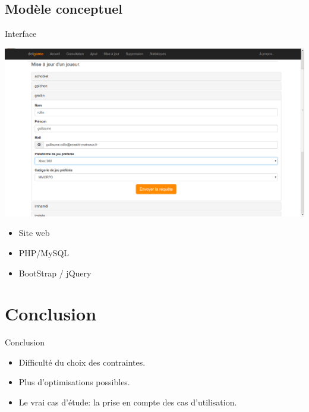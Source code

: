 \documentclass{beamer}
\begin{document}
\subsection{Modèle conceptuel}
\begin{frame}
\begin{block}{Interface}
\begin{center}
\includegraphics[scale=0.20]{capture2.png}
\end{center}
\begin{itemize}
\item Site web
\item PHP/MySQL
\item BootStrap / jQuery
\end{itemize}
\end{block}
\end{frame}



\section*{Conclusion}
\begin{frame}
\begin{block}{Conclusion}
\begin{center}
\begin{itemize}
\item Difficulté du choix des contraintes.
\item Plus d'optimisations possibles.
\item Le vrai cas d'étude: la prise en compte des cas d'utilisation.
\end{itemize}
\end{center}
\end{block}
\end{frame}
\end{document}
